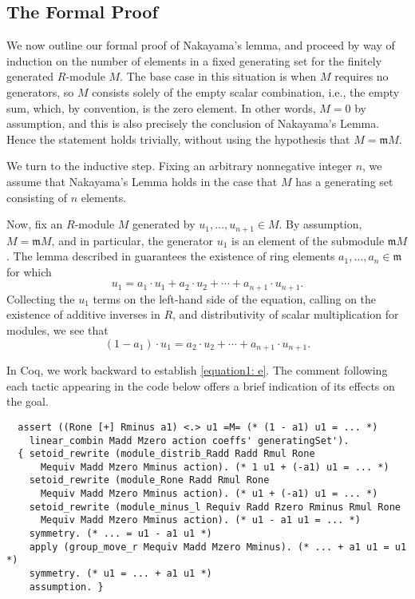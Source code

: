 \documentclass{article}
\begin{document}
\subsection{The Formal Proof}
We now outline our formal proof of Nakayama's lemma, and  proceed
by way of induction on the number of elements in a fixed generating set for the finitely generated $R$-module
$M$. The base case in this situation is when \(M\) requires no generators, so $M$
consists solely of the empty scalar combination, i.e., the empty sum, which, by
convention, is the zero element. In other words, $M = 0$ by assumption, and
this is also precisely the conclusion of Nakayama's Lemma.  Hence the statement holds
trivially, without using the hypothesis that $M = \mathfrak{m} M$.

We turn to the inductive step.  Fixing an arbitrary nonnegative integer $n$, 
we assume that Nakayama's Lemma holds in the case that $M$ has a generating set 
consisting of $n$ elements. 

Now, fix an $R$-module $M$ generated by $u_1, \ldots, u_{n+1} \in M$. By
assumption, \(M = \mathfrak{m} M\), and in particular, the generator $u_1$ is
an element of the submodule $\mathfrak{m} M$. The lemma described in 
guarantees the existence of ring elements $a_1, \ldots, a_n \in \mathfrak{m}$
for which 
\[u_{1} = a_{1} \cdot u_{1} + a_2 \cdot u_2 + \cdots + a_{n+1} \cdot u_{n+1}.\]
Collecting the \(u_{1}\) terms on the left-hand side of the equation, calling on 
the existence of additive inverses in $R$, and distributivity of scalar
multiplication for modules, we see that
\begin{equation}\label{equation1: e}
(1 - a_{1}) \cdot u_{1} =
  a_{2} \cdot u_{2} + \cdots + a_{n+1} \cdot u_{n+1}\text{.}
\end{equation}

In Coq, we work backward to establish \eqref{equation1: e}. The comment following
each tactic appearing in the code below offers a brief indication of its effects on the goal.
\begin{verbatim}
  assert ((Rone [+] Rminus a1) <.> u1 =M= (* (1 - a1) u1 = ... *)
    linear_combin Madd Mzero action coeffs' generatingSet').
  { setoid_rewrite (module_distrib_Radd Radd Rmul Rone
      Mequiv Madd Mzero Mminus action). (* 1 u1 + (-a1) u1 = ... *)
    setoid_rewrite (module_Rone Radd Rmul Rone
      Mequiv Madd Mzero Mminus action). (* u1 + (-a1) u1 = ... *)
    setoid_rewrite (module_minus_l Requiv Radd Rzero Rminus Rmul Rone
      Mequiv Madd Mzero Mminus action). (* u1 - a1 u1 = ... *)
    symmetry. (* ... = u1 - a1 u1 *)
    apply (group_move_r Mequiv Madd Mzero Mminus). (* ... + a1 u1 = u1 *)
    symmetry. (* u1 = ... + a1 u1 *)
    assumption. }
\end{verbatim}
\end{document}
